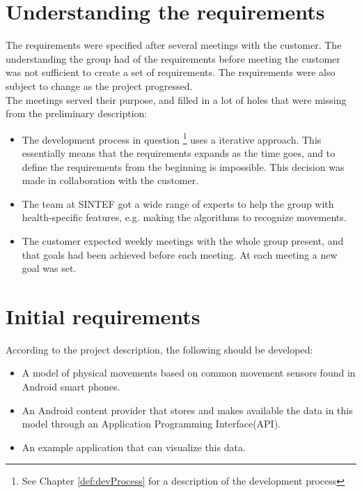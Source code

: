 \section{Understanding the requirements}

The requirements were specified after several meetings with the customer. The understanding the group had of the requirements before meeting the customer was not sufficient to create a set of requirements. The requirements were also subject to change as the project progressed. \\

The meetings served their purpose, and filled in a lot of holes that were missing from the preliminary description:
\begin{itemize}
\item The development process in question \footnote{See Chapter \ref{def:devProcess} for a description of the development process} uses a iterative approach. This essentially means that the requirements expands as the time goes, and to define the requirements from the beginning is impossible. This decision was made in collaboration with the customer.
\item The team at SINTEF got a wide range of experts to help the group with health-specific features, e.g. making the algorithms to recognize movements.
\item The customer expected weekly meetings with the whole group present, and that goals had been achieved before each meeting. At each meeting a new goal was set.
\end{itemize}

\section{Initial requirements}

According to the project description, the following should be developed:
\begin{itemize}
\item A model of physical movements based on common movement sensors found in Android smart phones.
\item An Android content provider that stores and makes available the data in this model through an Application Programming Interface(API).
\item An example application that can visualize this data.
\end{itemize}
